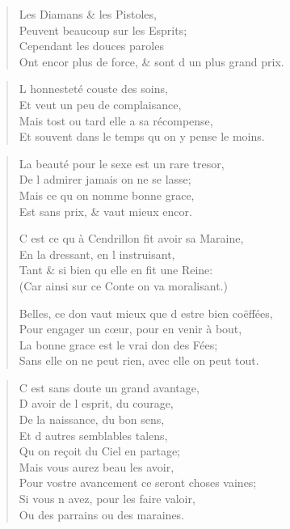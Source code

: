 \begin{verse}
\vin Les Diamans \& les Pistoles, \\
\vin\vin Peuvent beaucoup sur les Esprits; \\
\vin Cependant les douces paroles \\
Ont encor plus de force, \& sont d\textquotesingle{} un plus grand prix.
\end{verse}

\begin{verse}
\vin L\textquotesingle{} honnesteté couste des soins, \\
\vin Et veut un peu de complaisance, \\
\vin Mais tost ou tard elle a sa récompense, \\
Et souvent dans le temps qu\textquotesingle{} on y pense le moins.
\end{verse}

\begin{verse}
La beauté pour le sexe est un rare tresor, \\
\vin De l\textquotesingle{} admirer jamais on ne se lasse; \\
\vin Mais ce qu\textquotesingle{} on nomme bonne grace, \\
\vin Est sans prix, \& vaut mieux encor.

\vin C\textquotesingle{} est ce qu\textquotesingle{} à Cendrillon fit avoir sa Maraine, \\
\vin En la dressant, en l\textquotesingle{} instruisant, \\
\vin Tant \& si bien qu\textquotesingle{} elle en fit une Reine: \\
(Car ainsi sur ce Conte on va moralisant.)

\vin Belles, ce don vaut mieux que d\textquotesingle{} estre bien coëffées, \\
Pour engager un cœur, pour en venir à bout, \\
\vin La bonne grace est le vrai don des Fées; \\
Sans elle on ne peut rien, avec elle on peut tout.
\end{verse}

\begin{verse}
\vin\vin C\textquotesingle{} est sans doute un grand avantage, \\
\vin\vin D\textquotesingle{} avoir de l\textquotesingle{} esprit, du courage, \\
\vin\vin De la naissance, du bon sens, \\
\vin\vin Et d\textquotesingle{} autres semblables talens, \\
\vin\vin Qu\textquotesingle{} on reçoit du Ciel en partage; \\
\vin\vin Mais vous aurez beau les avoir, \\
Pour vostre avancement ce seront choses vaines; \\
\vin Si vous n\textquotesingle{} avez, pour les faire valoir, \\
\vin Ou des parrains ou des maraines.
\end{verse}

